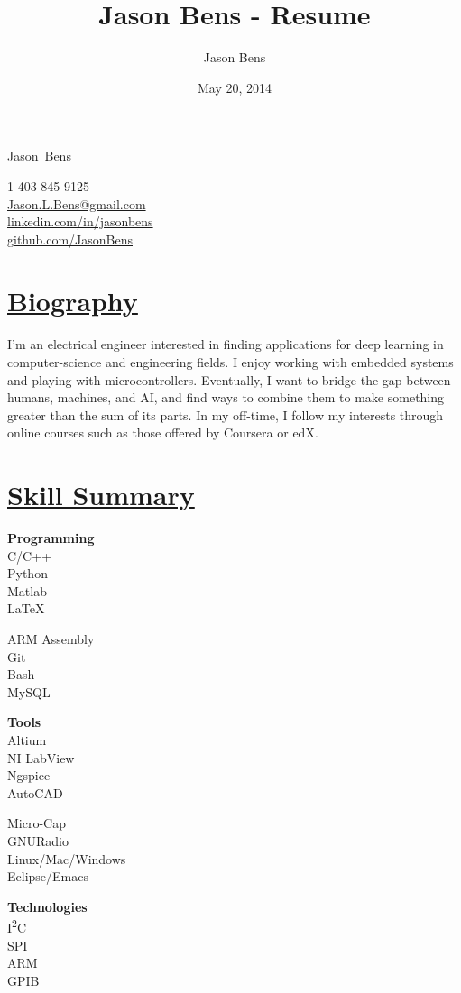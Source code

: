 \documentclass[a4paper, 11pt]{article}
\title{Jason Bens - Resume}
\author{Jason Bens}
\date{May 20, 2014}
\makeatletter
\newcommand {\firstname} {Jason}
\newcommand {\lastname} {Bens}
\newcommand {\phone} {\mbox{1-403-845-9125}}
\newcommand {\email} {\url{Jason.L.Bens@gmail.com}}
\newcommand {\linkedin} {\url{linkedin.com/in/jasonbens}}
\newcommand {\github} {\url{github.com/JasonBens}}
\makeatother
\begin{document}
\begin{minipage}[t]{0.7\textwidth}
  \begin{center}
    {\Huge \firstname~\lastname}
  \end{center}
\end{minipage}\hfill
\begin{minipage}{0.3\textwidth}
  \begin{flushright}
    \phone \\
    \email \\
    \linkedin \\
    \github \\
  \end{flushright}
\end{minipage}

\hrulefill

\section{\underline{Biography}}
I'm an electrical engineer interested in finding applications for deep learning in computer-science and engineering fields. I enjoy working with embedded systems and playing with microcontrollers. Eventually, I want to bridge the gap between humans, machines, and AI, and find ways to combine them to make something greater than the sum of its parts. In my off-time, I follow my interests through online courses such as those offered by Coursera or edX.

\section{\underline{Skill Summary}}
  \parbox{0.16\textwidth}{
    \textbf{Programming}\\
    C/C++\\
    Python\\
    Matlab\\
    \LaTeX
  } 
  \parbox{0.18\textwidth}{
    \bigskip
    ARM Assembly\\
    Git\\
    Bash\\
    MySQL 
  } \hfill
  \parbox{0.14\textwidth}{
    \textbf{Tools}\\
    Altium\\
    NI LabView\\
    Ngspice\\
    AutoCAD
  }
  \parbox{0.23\textwidth}{
    \bigskip
    Micro-Cap\\
    GNURadio\\
    Linux/Mac/Windows\\
    Eclipse/Emacs    
  } \hfill\ignorespaces
  \parbox{0.15\textwidth}{
    \textbf{Technologies}\\
    I\textsuperscript{2}C\\
    SPI\\
    ARM\\
    GPIB
  } \hfill
  \medskip
  
\end{document}
